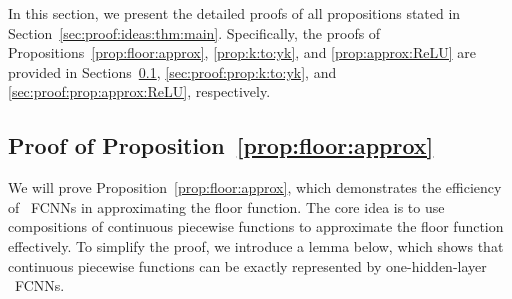 \documentclass[11pt,a4paper]{article}
\begin{document}
In this section, we present the detailed proofs of all propositions stated in Section~\ref{sec:proof:ideas:thm:main}. Specifically, the proofs of Propositions~\ref{prop:floor:approx}, \ref{prop:k:to:yk}, and \ref{prop:approx:ReLU} are provided in Sections~\ref{sec:proof:prop:floor:approx}, \ref{sec:proof:prop:k:to:yk}, and \ref{sec:proof:prop:approx:ReLU}, respectively.


\subsection{Proof of Proposition~\ref{prop:floor:approx}}
\label{sec:proof:prop:floor:approx}

We will prove Proposition~\ref{prop:floor:approx}, which demonstrates the efficiency of \ReLU\ FCNNs in approximating the floor function. The core idea is to use compositions of continuous piecewise functions to approximate the floor function effectively. To simplify the proof, we introduce a lemma below, which shows that continuous piecewise functions can be exactly represented by one-hidden-layer \ReLU\ FCNNs.
\end{document}
